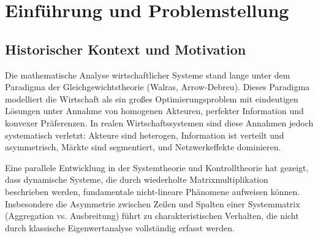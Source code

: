 \documentclass[a4paper,12pt]{article}
\theoremstyle{definition}
\begin{document}
\begin{abstract}
\begin{enumerate}
\item \textbf{Algorithmen und Komplexitätsanalyse:} Konstruktion effizienter Algorithmen mit polynomieller Zeitkomplexität $\mathcal{O}(n^{2.5})$ unter Ausnutzung asymmetrischer Sparsity-Strukturen.
\end{enumerate}

Die zentrale These dieser Arbeit lautet: \emph{Die Multiplikationslängen-Methode offenbart ein fundamentales Dilemma der Systemanalyse: Mit wachsender Multiplikationslänge erhöht sich sowohl die mathematische Präzision der Darstellung als auch die strukturelle Unsicherheit des Systems. Dies ist nicht durch bessere Datenqualität zu überwinden, sondern eine tiefe mathematische Konsequenz der iterativen Transformation. Diese Polarität ist für dezentralisierte Systeme unvermeidbar und spiegelt die Unmöglichkeit wider, Kurz- und Langzeitvorhersagen mit einheitlicher Präzision zu treffen.}

\textbf{Schlüsselwörter:} Multiplikationslängen-Methode, gestaffelte Matrix-Transformationen, Ljapunov-Stabilität, spektrale Konvergenz, strukturelle Unsicherheit, Wirtschaftliche Systemtheorie, Elektrotechnisch-Wirtschaftliche Dualität, dezentralisierte Systeme, charakteristische Matrizen, Komplexitätsanalyse

\end{abstract}

\tableofcontents

\newpage

\section{Einführung und Problemstellung}

\subsection{Historischer Kontext und Motivation}

Die mathematische Analyse wirtschaftlicher Systeme stand lange unter dem Paradigma der Gleichgewichtstheorie (Walras, Arrow-Debreu). Dieses Paradigma modelliert die Wirtschaft als ein großes Optimierungsproblem mit eindeutigen Lösungen unter Annahme von homogenen Akteuren, perfekter Information und konvexer Präferenzen. In realen Wirtschaftssystemen sind diese Annahmen jedoch systematisch verletzt: Akteure sind heterogen, Information ist verteilt und asymmetrisch, Märkte sind segmentiert, und Netzwerkeffekte dominieren.

Eine parallele Entwicklung in der Systemtheorie und Kontrolltheorie hat gezeigt, dass dynamische Systeme, die durch wiederholte Matrixmultiplikation beschrieben werden, fundamentale nicht-lineare Phänomene aufweisen können. Insbesondere die Asymmetrie zwischen Zeilen und Spalten einer Systemmatrix (Aggregation vs. Ausbreitung) führt zu charakteristischen Verhalten, die nicht durch klassische Eigenwertanalyse vollständig erfasst werden.
\end{document}
